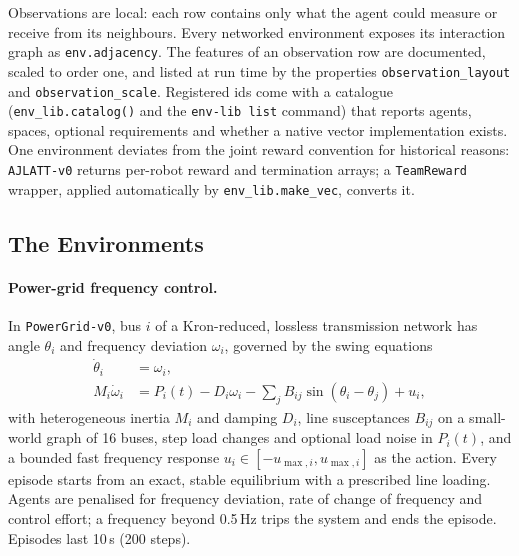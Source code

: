 \documentclass{article}
\newcommand{\code}[1]{\texttt{#1}}
\newcommand{\envid}[1]{\texttt{#1}}
\begin{document}
Observations are local: each row contains only what the agent could measure
or receive from its neighbours. Every networked environment exposes its
interaction graph as \code{env.adjacency}. The features of an observation row
are documented, scaled to order one, and listed at run time by the properties
\code{observation\_layout} and \code{observation\_scale}. Registered ids come with a catalogue
(\code{env\_lib.catalog()} and the \code{env-lib list} command) that reports
agents, spaces, optional requirements and whether a native vector
implementation exists. One environment deviates from the joint reward
convention for historical reasons: \envid{AJLATT-v0} returns per-robot reward
and termination arrays; a \code{TeamReward} wrapper, applied automatically by
\code{env\_lib.make\_vec}, converts it.

\subsection{The Environments}\label{sec:envs}

\paragraph{Power-grid frequency control.} In \envid{PowerGrid-v0}, bus $i$ of
a Kron-reduced, lossless transmission network has angle $\theta_i$ and
frequency deviation $\omega_i$, governed by the swing equations
\citep{kundur1994power,dorfler2013smartgrids}
\begin{align}
  \dot\theta_i &= \omega_i, \nonumber\\
  M_i \dot\omega_i &= P_i(t) - D_i\omega_i
    - \textstyle\sum_j B_{ij}\sin(\theta_i-\theta_j) + u_i,
\end{align}
with heterogeneous inertia $M_i$ and damping $D_i$, line susceptances
$B_{ij}$ on a small-world graph of 16 buses, step load changes and optional
load noise in $P_i(t)$, and a bounded fast frequency response
$u_i \in [-u_{\max,i}, u_{\max,i}]$ as the action. Every episode starts from an
exact, stable equilibrium with a prescribed line loading. Agents are penalised
for frequency deviation, rate of change of frequency and control effort; a
frequency beyond 0.5\,Hz trips the system and ends the episode. Episodes last
10\,s (200 steps).
\end{document}
